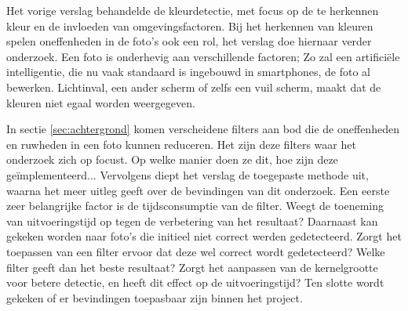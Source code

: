 Het vorige verslag behandelde de kleurdetectie, met focus op de te herkennen kleur en de invloeden van omgevingsfactoren. Bij het herkennen van kleuren spelen oneffenheden in de foto's ook een rol, het verslag doe hiernaar verder onderzoek. Een foto is onderhevig aan verschillende factoren; Zo zal een artificiële intelligentie, die nu vaak standaard is ingebouwd in smartphones, de foto al bewerken. Lichtinval, een ander scherm of zelfs een vuil scherm, maakt dat de kleuren niet egaal worden weergegeven.

In sectie \ref{sec:achtergrond} komen verscheidene filters aan bod die de oneffenheden en ruwheden in een foto kunnen reduceren. Het zijn deze filters waar het onderzoek zich op focust. Op welke manier doen ze dit, hoe zijn deze geïmplementeerd... Vervolgens diept het verslag de toegepaste methode uit, waarna het meer uitleg geeft over de bevindingen van dit onderzoek. Een eerste zeer belangrijke factor is de tijdsconsumptie van de filter. Weegt de toeneming van uitvoeringstijd op tegen de verbetering van het resultaat? Daarnaast kan gekeken worden naar foto's die initieel niet correct werden gedetecteerd. Zorgt het toepassen van een filter ervoor dat deze wel correct wordt gedetecteerd? Welke filter geeft dan het beste resultaat? Zorgt het aanpassen van de kernelgrootte voor betere detectie, en heeft dit effect op de uitvoeringstijd?  Ten slotte wordt gekeken of er bevindingen toepasbaar zijn binnen het project.
